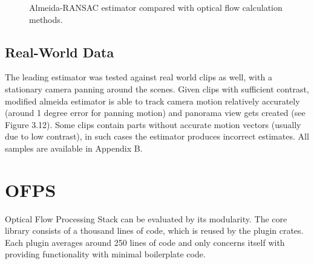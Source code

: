 \documentclass[11pt,english]{report}
\newcommand{\getstat}[1]{docs/statistics/#1}
\newcommand{\vidpic}[1]{
	\texttt{[image: docs/report/\#1]}
}
\newcommand{\statplot}[4]{
	\addplot[#3, mark = #4, thick, smooth, mark size = 2, mark options={fill=#3}] table [y=#2, col sep=comma] {\getstat{#1}};
}
\begin{document}
\begin{figure}[!ht]
\begin{center}
\end{center}
\caption{\centering Almeida-RANSAC estimator compared with optical flow calculation methods.}
\end{figure}

\subsection{Real-World Data}

The leading estimator was tested against real world clips as well, with a stationary camera panning around the scenes. Given clips with sufficient contrast, modified almeida estimator is able to track camera motion relatively accurately (around 1 degree error for panning motion) and panorama view gets created (see Figure 3.12). Some clips contain parts without accurate motion vectors (usually due to low contrast), in such cases the estimator produces incorrect estimates. All samples are available in Appendix B.

\section{OFPS}

Optical Flow Processing Stack can be evaluated by its modularity. The core library consists of a thousand lines of code, which is reused by the plugin crates. Each plugin averages around 250 lines of code and only concerns itself with providing functionality with minimal boilerplate code.
\end{document}
